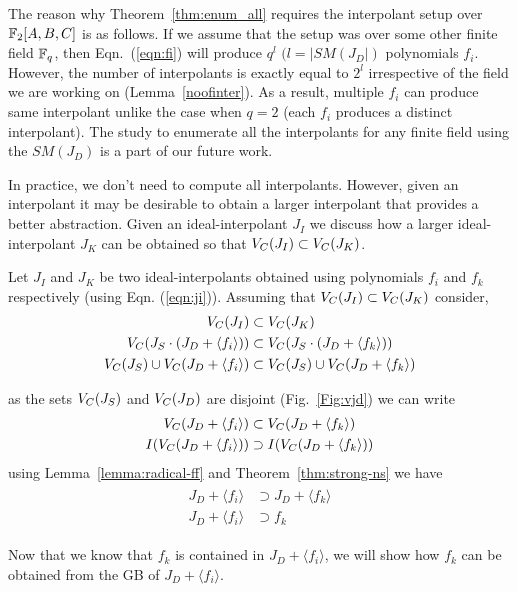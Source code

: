 The reason why Theorem~\ref{thm:enum_all} requires the interpolant setup over ${\mathbb{F}}_2[A,B,C]$ is as follows.
If we assume that the setup was over some other finite field ${\mathbb{F}}_{q}$, then Eqn.~(\ref{eqn:fi}) will 
produce $q^l$ $(l=|SM(J_D|)$ polynomials $f_i$. However, the number of interpolants is exactly equal 
to $2^l$ irrespective of the field we are working on (Lemma~\ref{noofinter}). As a result, multiple 
$f_i$ can produce same interpolant unlike the case when $q=2$ (each $f_i$ produces a distinct interpolant).
The study to enumerate all the interpolants for any finite field using the $SM(J_D)$ 
is a part of our future work.


\par In practice, we don't need to compute all interpolants. However, given an interpolant it may
be desirable to obtain a larger interpolant that provides a better abstraction.
Given an ideal-interpolant $J_I$ we discuss how a larger 
ideal-interpolant $J_K$ can be obtained so that ${V_C}(J_I) \subset {V_C}(J_K)$.

\par Let $J_I$ and $J_K$ be two ideal-interpolants obtained using polynomials
$f_i$ and $f_k$ respectively (using Eqn. (\ref{eqn:ji})). Assuming that 
${V_C}(J_I) \subset {V_C}(J_K)$ consider,
\begin{align*}
{V_C}(J_I) &\subset {V_C}(J_K) \\
{V_C}(J_S\cdot(J_D + \langle f_i \rangle)) &\subset {V_C}(J_S\cdot(J_D + \langle f_k \rangle)) \\ 
{V_C}(J_S) \cup {V_C}(J_D + \langle f_i \rangle) &\subset {V_C}(J_S) \cup {V_C}(J_D + \langle f_k \rangle)
\end{align*}
\par \noindent as the sets ${V_C}(J_S)$ and ${V_C}(J_D)$ are disjoint (Fig.~\ref{Fig:vjd}) we can
write
\begin{align*}
\label{eqn:chainofinter}
{V_C}(J_D + \langle f_i \rangle) &\subset {V_C}(J_D + \langle f_k \rangle) \\
I({V_C}(J_D + \langle f_i \rangle)) &\supset I({V_C}(J_D + \langle f_k \rangle)) 
\end{align*}
using Lemma~\ref{lemma:radical-ff} and Theorem~\ref{thm:strong-ns} we have
\begin{align}
\begin{split}
J_D + \langle f_i \rangle &\supset J_D + \langle f_k \rangle \\
J_D + \langle f_i \rangle &\supset f_k
\end{split}
\end{align}  
\par Now that we know that $f_k$ is contained in $J_D + \langle f_i \rangle$,
we will show how $f_k$ can be obtained from the GB of $J_D + \langle f_i \rangle$.

